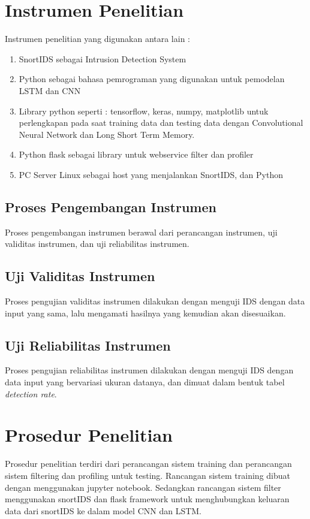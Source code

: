 \documentclass[./skripsi.tex]{subfiles}
\begin{document}
\section{Instrumen Penelitian}
Instrumen penelitian yang digunakan antara lain :
\begin{enumerate}
    \item SnortIDS sebagai Intrusion Detection System
    \item Python sebagai bahasa pemrograman yang digunakan untuk pemodelan LSTM dan CNN
    \item Library python seperti : tensorflow, keras, numpy, matplotlib untuk perlengkapan pada saat training data dan testing data dengan Convolutional Neural Network dan Long Short Term Memory.
    \item Python flask sebagai library untuk webservice filter dan profiler
    \item PC Server Linux sebagai host yang menjalankan SnortIDS, dan Python
\end{enumerate}
\subsection{Proses Pengembangan Instrumen}
\par Proses pengembangan instrumen berawal dari perancangan instrumen, uji validitas instrumen, dan uji reliabilitas instrumen.
\subsection{Uji Validitas Instrumen}
\par Proses pengujian validitas instrumen dilakukan dengan menguji IDS dengan data input yang sama, lalu mengamati hasilnya yang kemudian akan disesuaikan.
\subsection{Uji Reliabilitas Instrumen}
\par Proses pengujian reliabilitas instrumen dilakukan dengan menguji IDS dengan data input yang bervariasi ukuran datanya, dan dimuat dalam bentuk tabel \textit{detection rate}. 
\section{Prosedur Penelitian}
\par Prosedur penelitian terdiri dari perancangan sistem training dan perancangan sistem filtering dan profiling untuk testing. Rancangan sistem training dibuat dengan menggunakan jupyter notebook. Sedangkan rancangan sistem filter menggunakan snortIDS dan flask framework untuk menghubungkan keluaran data dari snortIDS ke dalam model CNN dan LSTM.
\end{document}
